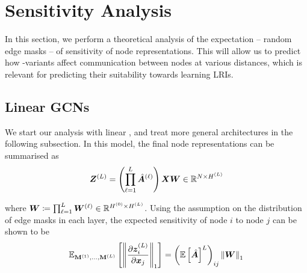 \section{Sensitivity Analysis}
\label{sec:theory}

In this section, we perform a theoretical analysis of the expectation -- \wrt random edge masks -- of sensitivity of node representations. This will allow us to predict how -variants affect communication between nodes at various distances, which is relevant for predicting their suitability towards learning LRIs.

\subsection{Linear GCNs}
\label{sec:linear}

We start our analysis with linear , and treat more general  architectures in the following subsection. %
In this model, the final node representations can be summarised as
\begin{align}
    \bm{Z}^{\left(L\right)} = \left(\prod_{\ell=1}^L \hat{\bm{A}}^{\left(\ell\right)}\right) \bm{X} \bm{W} \in \mathbb{R}^{N\times H^{\left(L\right)}}
\end{align}

where %
$\bm{W} \coloneqq \prod_{\ell=1}^L \bm{W}^{\left(\ell\right)} \in \mathbb{R}^{H^{\left(0\right)} \times H^{\left(L\right)}}$. Using the \iid assumption on the distribution of edge masks in each layer, the expected sensitivity of node $i$ to node $j$ can be shown to be
\begin{align}
    \mathbb{E}_{\mathbf{M}^{\left(1\right)}, \ldots, \mathbf{M}^{\left(L\right)}} \left[\left\|\frac{\partial \bm{z}^{\left(L\right)}_i}{\partial \bm{x}_j}\right\|_1\right] = \left(\mathbb{E}\left[\hat{\bm{A}}\right]^L\right)_{ij} \left\|\bm{W}\right\|_1 
\label{thm:sensitivity-l-layer}
\end{align}

